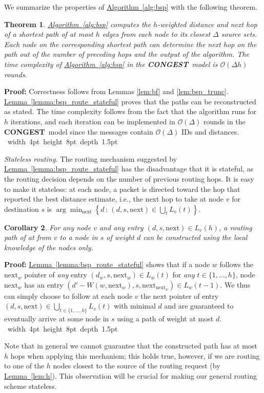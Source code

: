 \documentclass[letterpaper,11pt]{article}
\newcommand{\namedref}[2]{\hyperref[#2]{#1~\ref*{#2}}}
\newcommand{\lemmaref}[1]{\namedref{Lemma}{#1}}
\newcommand{\algref}[1]{\namedref{Algorithm}{#1}}
\newtheorem{theorem}{Theorem}[section]
\newtheorem{corollary}[theorem]{Corollary}
\newcommand{\blackslug}{\hbox{\hskip 1pt \vrule width 4pt height 8pt
depth 1.5pt \hskip 1pt}}
\newcommand{\QED}{\quad\blackslug\lower 8.5pt\null\par}
\newenvironment{proof}[1][Proof:]{\noindent \textbf{#1}\xspace}{\QED}
\newcommand{\BO}{\mathcal{O}}
\newcommand{\Set}[1]{\left\{ #1 \right\}}
\newcommand{\CONGEST}{\textbf{CONGEST}}
\newcommand{\Next}{\mathrm{next}}
\begin{document}
We summarize the properties of \algref{alg:bsp} with the following
theorem. 
\begin{theorem}\label{thm:bsp}
\algref{alg:bsp} computes the $h$-weighted distance and next hop of a shortest
path of at most $h$ edges from each node to its closest $\Delta$ source sets.
Each node on the corresponding shortest path can determine the next hop on the
path out of the number of preceding hops and the output of the algorithm.
The time complexity of \algref{alg:bsp} in the \CONGEST\ model is $\BO(\Delta
h)$ rounds.
\end{theorem}
\begin{proof}
Correctness follows from Lemmas \ref{lem:bf} and \ref{lem:bsp_trunc}.
\lemmaref{lemma:bsp_route_stateful} proves that the paths can be reconstructed
as stated. The time complexity follows from the fact that the algorithm runs for
$h$ iterations, and each iteration can be implemented  in $\BO(\Delta)$ rounds
in the \CONGEST\ model since the messages contain $\BO(\Delta)$ IDs and
distances.
\end{proof}

\emph{Stateless routing.} 
The routing mechanism suggested by \lemmaref{lemma:bsp_route_stateful} has the
disadvantage that it is stateful, as the routing decision depends on the number
of previous routing hops. It is easy to make it stateless: at each
node, a packet is directed toward the hop that reported the best
distance estimate, i.e., the next hop to take at node $v$ for
destination $s$ is $\arg\min_{\Next}\Set{d\,:\,(d,s,\Next)\in
  \bigcup_t L_v(t)}$.
\begin{corollary}\label{coro:bsp_route_stateless}
For any node $v$ and any entry $(d,s,\Next)\in L_v(h)$, a routing path of at
from $v$ to a node in $s$ of weight $d$ can be constructed using the local
knowledge of the nodes only.
\end{corollary}
\begin{proof}
\lemmaref{lemma:bsp_route_stateful} shows that if a node $w$ follows the
$\Next_w$ pointer of \emph{any} entry $(d_w,s,\Next_w)\in L_w(t)$ for \emph{any}
$t\in \{1,\ldots,h\}$, node $\Next_w$ has an entry
$(d'-W(w,\Next_w),s,\Next_{\Next_w})\in L_w(t-1)$. We thus can simply choose to
follow at each node $v$ the $\Next$ pointer of entry $(d,s,\Next)\in
\bigcup_{t\in \{1,\ldots,h\}}L_v(t)$ with minimal $d$ and are guaranteed to
eventually arrive at some node in $s$ using a path of weight at most $d$.
\end{proof}
Note that in general we cannot guarantee that the constructed path has at most
$h$ hops when applying this mechanism; this holds true, however,  if we
are routing to one of the $h$ nodes closest to the source of the
routing request (by \lemmaref{lem:h}). This observation will be crucial for
making our general routing scheme stateless.
\end{document}
